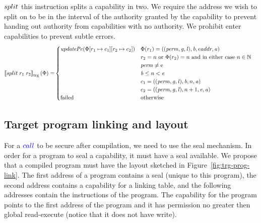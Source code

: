 \documentclass[a4paper]{article}
\newcommand{\sem}[1]{\left\llbracket #1 \right\rrbracket}
\newcommand{\tsem}[2][\Phi]{\sem{#2}_{\mathrm{trg}}(#1)}
\newcommand{\totherwise}{\text{otherwise }}
\newcommand{\sourcecolor}[1]{\color{blue}}
\newcommand{\src}[1]{{\sourcecolor{} #1}}
\newcommand{\targetcolor}[1]{\color{black}}
\newcommand{\trg}[1]{{\targetcolor{} #1}}
\newcommand{\zinstr}[1]{#1}
\newcommand{\twoinstr}[3]{
  \ifthenelse{\equal{#2#3}{}}
  {\zinstr{#1}}
  {\zinstr{#1} \; #2 \; #3}
}
\newcommand{\scall}[2]{\twoinstr{\src{call}}{#1}{#2}}
\newcommand{\tsplit}[2]{\twoinstr{\trg{split}}{#1}{#2}}
\newcommand{\nats}{\mathbb{N}}
\newcommand{\update}[2]{[#1 \mapsto #2]}
\newcommand{\perm}{\var{perm}}
\newcommand{\gl}{\var{g}}
\newcommand{\lin}{\var{l}}
\newcommand{\failed}{\mathrm{failed}}
\newcommand{\var}[1]{\mathit{#1}}
\newcommand{\baddr}{\var{b}}
\newcommand{\eaddr}{\var{e}}
\newcommand{\aaddr}{\var{a}}
\newcommand{\plainperm}[1]{\mathrm{#1}}
\newcommand{\enter}{\plainperm{e}}
\newcommand{\plainfun}[2]{
  \ifthenelse{\equal{#2}{}}
  {\mathit{#1}}
  {\mathit{#1}(#2)}
}
\newcommand{\updPcAddr}[1]{\plainfun{updatePc}{#1}}
\begin{document}
$\tsplit{}{}$ this instruction splits a capability in two. We require the address we wish to split on to be in the interval of the authority granted by the capability to prevent handing out authority from capabilities with no authority. We prohibit enter capabilities to prevent subtle errors. 
\begin{align*}
  \tsem{\tsplit{r_1}{r_2}} = &
                               \begin{cases}
                                 \updPcAddr{\Phi\update{r_1}{c_1}\update{r_2}{c_2}} &
                                 \arraycolsep=0pt
                                 \begin{array}[t]{l}
                                   \Phi(r_1) = ((\perm, \gl, \lin), \baddr, eaddr, \aaddr) \\
                                   r_2 = n \text{ or } \Phi(r_2) = n \text{ and in either case } n \in \nats\\
                                   \perm \neq \enter\\
                                   \baddr \leq n  < \eaddr\\
                                   c_1 = ((\perm,\gl,\lin),\baddr, n, \aaddr) \\
                                   c_2 = ((\perm,\gl,\lin),n + 1, \eaddr,\aaddr)
                                 \end{array} \\
                                 \failed & \totherwise
                               \end{cases}
\end{align*}


\subsection{Target program linking and layout}
For a $\scall{}{}$ to be secure after compilation, we need to use the seal mechanism. In order for a program to seal a capability, it must have a seal available. We propose that a compiled program must have the layout sketched in Figure~\ref{fig:trg-prog-link}. The first address of a program contains a seal (unique to this program), the second address contains a capability for a linking table, and the following addresses contain the instructions of the program. The capability for the program points to the first address of the program and it has permission no greater then global read-execute (notice that it does not have write).
\end{document}
